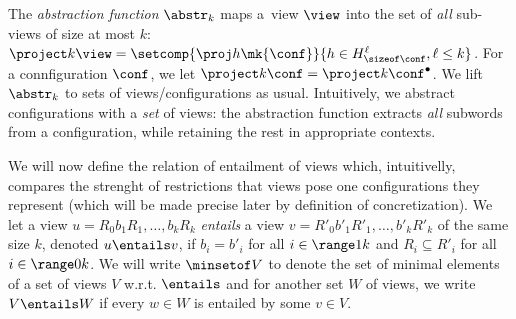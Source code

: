 The {\it abstraction function} $\abstr_k$ maps a~view
$\view$ %
into the set of \emph{all} sub-views of size at most $k$:
%
$\project k \view = %
\setcomp{\proj h {\mk{\conf}}}{h\in H_{\sizeof \conf}^\ell,\ell\leq k}$.
%
For a connfiguration $\conf$, we let $\project k \conf = \project k {\conf^\bullet}$.
We lift $\abstr_k$ to sets of views/configurations as usual.
%
Intuitively, we abstract configurations with a \emph{set} of views:
the abstraction function extracts \emph{all} subwords from a
configuration, while retaining the rest in appropriate contexts. %
%

We will now define the relation of entailment of views which, intuitivelly, compares the strenght of restrictions that views pose one configurations they represent (which will be made precise later by definition of concretization).
We let a view $u = R_0b_1R_1,\ldots,b_kR_k$ \emph{entails} a view $v = R'_0b'_1R'_1,\ldots,b'_kR'_k$ of the same size $k$, denoted $u\entails v$, if $b_i=b'_i$ for all
$i\in\range 1 k$ and $R_i\subseteq R'_i$ for all $i\in\range 0 k$. %
%
We will write $\minsetof V$ to denote the set of minimal elements of a set of views $V$ w.r.t. $\entails$ and for another set $W$ of views, 
we write $V\entails W$ if every $w\in W$ is entailed by some $v\in V$.


%

